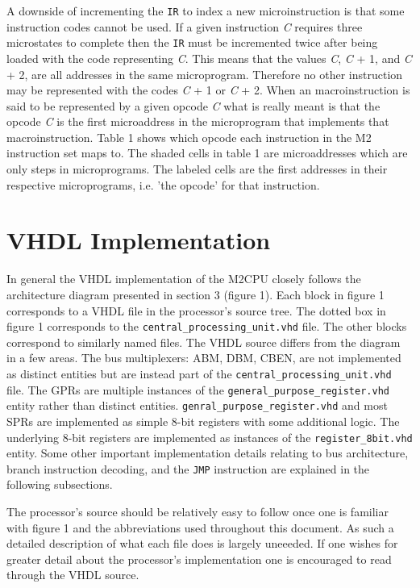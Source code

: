 \documentclass[a4paper,12pt]{article}
\newcommand{\mt}{M2CPU}
\newcommand{\mi}{M2 instruction set}
\newcommand{\IR}{\texttt{IR}}
\begin{document}
A downside of incrementing the \IR{} to index a new microinstruction is that 
some instruction codes cannot be used. If a given instruction \textit{C} 
requires three microstates to complete then the \IR{} must be incremented twice
after being loaded with the code representing \textit{C}. This means that the
values \textit{C}, \textit{C} + 1, and \textit{C} + 2, are all addresses in the
same microprogram. Therefore no other instruction may be represented with the
codes \textit{C} + 1 or \textit{C} + 2. When an macroinstruction is said to be
represented by a given opcode \textit{C} what is really meant is that the 
opcode \textit{C} is the first microaddress in the microprogram that implements
that macroinstruction. Table 1 shows which opcode each instruction in the \mi{}
maps to. The shaded cells in table 1 are microaddresses which are only steps
in microprograms. The labeled cells are the first addresses in their respective
microprograms, i.e. 'the opcode' for that instruction.
\par

\newpage
\section{VHDL Implementation}
In general the VHDL implementation of the \mt{} closely follows the 
architecture diagram presented in section 3 (figure 1). Each block in figure 1
corresponds to a VHDL file in the processor's source tree. The dotted box in 
figure 1 corresponds to the \texttt{central\_processing\_unit.vhd} file. The
other blocks correspond to similarly named files. The VHDL source differs from
the diagram in a few areas. The bus multiplexers: ABM, DBM, CBEN, are not 
implemented as distinct entities but are instead part of the 
\texttt{central\_processing\_unit.vhd} file. The GPRs are multiple instances
of the \texttt{general\_purpose\_register.vhd} entity rather than distinct
entities. \texttt{genral\_purpose\_register.vhd} and most SPRs are implemented
as simple 8-bit registers with some additional logic. The underlying 8-bit 
registers are implemented as instances of the \texttt{register\_8bit.vhd} 
entity. Some other important implementation details relating to bus 
architecture, branch instruction decoding, and the \texttt{JMP} instruction are
explained in the following subsections.

The processor's source should be relatively easy to follow once one is familiar
with figure 1 and the abbreviations used throughout this document. As such a 
detailed description of what each file does is largely uneeeded. If one
wishes for greater detail about the processor's implementation one is encouraged
to read through the VHDL source.
\par
\end{document}
